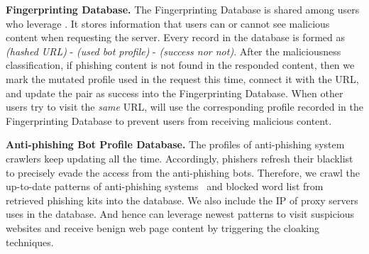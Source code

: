 \noindent
\textbf{Fingerprinting Database.}
The Fingerprinting Database is shared among users who leverage \spartacus.
It stores information that users can or cannot see malicious content when requesting the server.
Every record in the database is formed as \emph{(hashed URL)} - \emph{(used bot profile)} - \emph{(success nor not)}.
After the maliciousness classification, if phishing content is not found in the responded content, then we mark the mutated profile used in the request this time, connect it with the URL, and update the pair as success into the Fingerprinting Database.
When other users try to visit the \emph{same} URL, \spartacus will use the corresponding profile recorded in the Fingerprinting Database to prevent users from receiving malicious content.

\noindent
\textbf{Anti-phishing Bot Profile Database.}
The profiles of anti-phishing system crawlers keep updating all the time.
Accordingly, phishers refresh their blacklist to precisely evade the access from the anti-phishing bots.
Therefore, we crawl the up-to-date patterns of anti-phishing systems~\cite{crawlerinfo} and blocked word list from retrieved phishing kits into the database.
We also include the IP of proxy servers \spartacus uses in the database.
And hence \spartacus can leverage newest patterns to visit suspicious websites and receive benign web page content by triggering the cloaking techniques.






